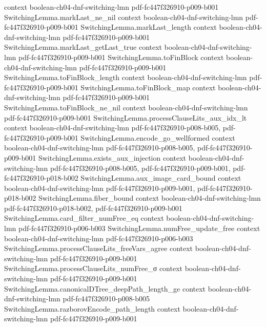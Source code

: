 \begin{lemma}
  {context}
  {boolean-ch04-dnf-switching-lmn}
  {pdf-fc447f326910-p009-b001}
\proofstep
  {SwitchingLemma.markLast_ne_nil}
  {context}
  {boolean-ch04-dnf-switching-lmn}
  {pdf-fc447f326910-p009-b001}
\proofstep
  {SwitchingLemma.markLast_length}
  {context}
  {boolean-ch04-dnf-switching-lmn}
  {pdf-fc447f326910-p009-b001}
\proofstep
  {SwitchingLemma.markLast_getLast_true}
  {context}
  {boolean-ch04-dnf-switching-lmn}
  {pdf-fc447f326910-p009-b001}
\proofstep
  {SwitchingLemma.toFinBlock}
  {context}
  {boolean-ch04-dnf-switching-lmn}
  {pdf-fc447f326910-p009-b001}
\proofstep
  {SwitchingLemma.toFinBlock_length}
  {context}
  {boolean-ch04-dnf-switching-lmn}
  {pdf-fc447f326910-p009-b001}
\proofstep
  {SwitchingLemma.toFinBlock_map}
  {context}
  {boolean-ch04-dnf-switching-lmn}
  {pdf-fc447f326910-p009-b001}
\proofstep
  {SwitchingLemma.toFinBlock_ne_nil}
  {context}
  {boolean-ch04-dnf-switching-lmn}
  {pdf-fc447f326910-p009-b001}
\proofstep
  {SwitchingLemma.processClauseLits_aux_idx_lt}
  {context}
  {boolean-ch04-dnf-switching-lmn}
  {pdf-fc447f326910-p008-b005,
    pdf-fc447f326910-p009-b001}
\proofstep
  {SwitchingLemma.encode_go_wellformed}
  {context}
  {boolean-ch04-dnf-switching-lmn}
  {pdf-fc447f326910-p008-b005,
    pdf-fc447f326910-p009-b001}
\proofstep
  {SwitchingLemma.exists_aux_injection}
  {context}
  {boolean-ch04-dnf-switching-lmn}
  {pdf-fc447f326910-p008-b005,
    pdf-fc447f326910-p009-b001,
    pdf-fc447f326910-p018-b002}
\proofstep
  {SwitchingLemma.aux_image_card_bound}
  {context}
  {boolean-ch04-dnf-switching-lmn}
  {pdf-fc447f326910-p009-b001,
    pdf-fc447f326910-p018-b002}
\proofstep
  {SwitchingLemma.fiber_bound}
  {context}
  {boolean-ch04-dnf-switching-lmn}
  {pdf-fc447f326910-p018-b002,
    pdf-fc447f326910-p009-b001}
\proofstep
  {SwitchingLemma.card_filter_numFree_eq}
  {context}
  {boolean-ch04-dnf-switching-lmn}
  {pdf-fc447f326910-p006-b003}
\proofstep
  {SwitchingLemma.numFree_update_free}
  {context}
  {boolean-ch04-dnf-switching-lmn}
  {pdf-fc447f326910-p006-b003}
\proofstep
  {SwitchingLemma.processClauseLits_freeVars_agree}
  {context}
  {boolean-ch04-dnf-switching-lmn}
  {pdf-fc447f326910-p009-b001}
\proofstep
  {SwitchingLemma.processClauseLits_numFree_σ}
  {context}
  {boolean-ch04-dnf-switching-lmn}
  {pdf-fc447f326910-p009-b001}
\proofstep
  {SwitchingLemma.canonicalDTree_deepPath_length_ge}
  {context}
  {boolean-ch04-dnf-switching-lmn}
  {pdf-fc447f326910-p008-b005}
\proofstep
  {SwitchingLemma.razborovEncode_path_length}
  {context}
  {boolean-ch04-dnf-switching-lmn}
  {pdf-fc447f326910-p009-b001}
\proofstep

\end{lemma}
